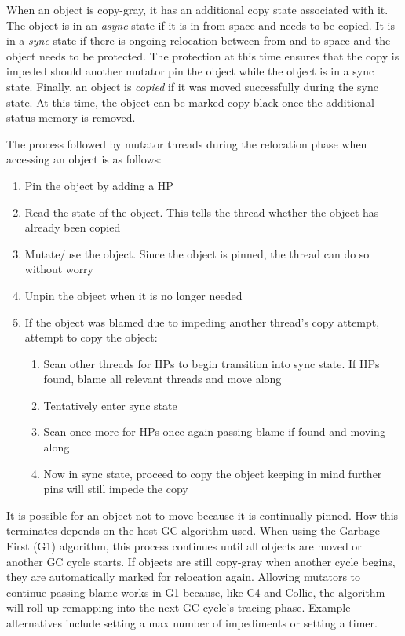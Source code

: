 \documentclass{sig-alternate}
\begin{document}
When an object is copy-gray, it has an additional copy state associated
with it. The object is in an \emph{async} state if it is in from-space
and needs to be copied. It is in a \emph{sync} state if there is
ongoing relocation between from and to-space and the object needs to
be protected. The protection at this time ensures that the copy is impeded 
should another mutator pin the object while the object is in a sync state. 
Finally, an object is \emph{copied} if it was moved
successfully during the sync state. At this time, the object can be marked
copy-black once the additional status memory is removed.

The process followed by mutator threads during the relocation phase when 
accessing an object is as follows:
\begin{enumerate}
\item Pin the object by adding a HP
\item Read the state of the object. This tells the thread whether the object
has already been copied
\item Mutate/use the object. Since the object is pinned, the thread can 
do so without worry
\item Unpin the object when it is no longer needed
\item If the object was blamed due to impeding another thread's copy attempt, 
attempt to copy the object:
\begin{enumerate}
\item Scan other threads for HPs to begin transition into sync state. If HPs found,
blame all relevant threads and move along
\item Tentatively enter sync state
\item Scan once more for HPs once again passing blame if found and moving along
\item Now in sync state, proceed to copy the object keeping in mind further
pins will still impede the copy
\end{enumerate}
\end{enumerate}

It is possible for an
object not to move because it is continually pinned. How this terminates 
depends on the host GC algorithm used. When using the Garbage-First (G1) algorithm,
this process continues until all objects are moved or another GC cycle starts.
If objects are still copy-gray when another cycle begins, they are automatically
marked for relocation again. Allowing mutators to continue passing blame works
in G1 because, like C4 and Collie, the algorithm will roll up remapping into the next
GC cycle's tracing phase. Example alternatives include setting a max number of impediments
or setting a timer.
\end{document}
